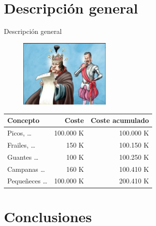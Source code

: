 \documentclass{beamer}
\begin{document}
\section{Descripción general}

\begin{frame}{Descripción general}

\begin{figure}
\includegraphics[width=0.4\textwidth]{cuentas}
\end{figure}

\begin{center}
{\scriptsize
\begin{tabular}{|l|r||r|}
\hline
Concepto & Coste & Coste acumulado \\
\hline
\hline
Picos, \ldots & 100.000 K & 100.000 K\\
\hline
Frailes, \ldots & 150 K & 100.150 K \\
\hline
Guantes \ldots & 100 K & 100.250 K \\
\hline
Campanas \ldots & 160 K & 100.410 K \\
\hline
Pequeñeces \ldots  & 100.000 K & 200.410 K \\
\hline
\end{tabular}}
\end{center}


\end{frame}

\section{Conclusiones}
\end{document}
